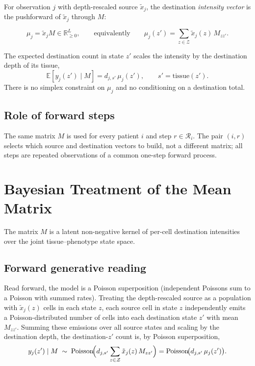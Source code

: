 \documentclass[11pt]{article}
\newcommand{\Reals}{\mathbb{R}}
\newcommand{\Zsp}{\mathcal{Z}}                    %
\newcommand{\Rsp}{\mathcal{R}}                    %
\newcommand{\E}{\mathbb{E}}
\DeclareMathOperator{\Pois}{Poisson}
\theoremstyle{definition}
\begin{document}
For observation $j$ with depth-rescaled source $\tilde{x}_j$, the destination
\emph{intensity vector} is the pushforward of $\tilde{x}_j$ through $M$:

\begin{keybox}[title={Destination intensity}]
\[
  \mu_j = \tilde{x}_j M \in \Reals_{\geq 0}^{L},
  \qquad\text{equivalently}\qquad
  \mu_j(z')
  =
  \sum_{z\in\Zsp} \tilde{x}_j(z)\, M_{zz'} .
\]
\end{keybox}

The expected destination count in state $z'$ scales the intensity by the
destination depth of its tissue,
\[
  \E\!\left[ y_j(z') \mid M \right] = d_{j,s'}\, \mu_j(z'),
  \qquad s' = \mathrm{tissue}(z') .
\]
There is no simplex constraint on $\mu_j$ and no conditioning on a destination
total.

\subsection{Role of forward steps}

The same matrix $M$ is used for every patient $i$ and step $r \in \Rsp_i$. The
pair $(i,r)$ selects which source and destination vectors to build, not a
different matrix; all steps are repeated observations of a common one-step
forward process.

\section{Bayesian Treatment of the Mean Matrix}

The matrix $M$ is a latent non-negative kernel of per-cell destination
intensities over the joint tissue--phenotype state space.

\subsection{Forward generative reading}

Read forward, the model is a Poisson superposition (independent Poissons sum to
a Poisson with summed rates). Treating the depth-rescaled
source as a population with $\tilde{x}_j(z)$ cells in each state $z$, each
source cell in state $z$ independently emits a Poisson-distributed number of
cells into each destination state $z'$ with mean $M_{zz'}$. Summing these
emissions over all source states and scaling by the destination depth, the
destination-$z'$ count is, by Poisson superposition,
\[
  y_j(z') \mid M
  \;\sim\;
  \Pois\!\Bigl( d_{j,s'} \sum_{z\in\Zsp} \tilde{x}_j(z)\, M_{zz'} \Bigr)
  =
  \Pois\!\bigl( d_{j,s'}\, \mu_j(z') \bigr) .
\]
\end{document}
